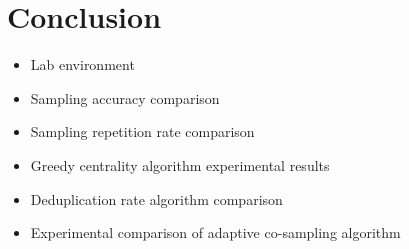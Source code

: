 \documentclass[conference,compsoc]{IEEEtran}
\begin{document}
\section{Conclusion}
\begin{itemize}
\item Lab environment
\item Sampling accuracy comparison
\item Sampling repetition rate comparison
\item Greedy centrality algorithm experimental results
 
\item Deduplication rate algorithm comparison

\item Experimental comparison of adaptive co-sampling algorithm
\end{itemize}






 






\end{document}
